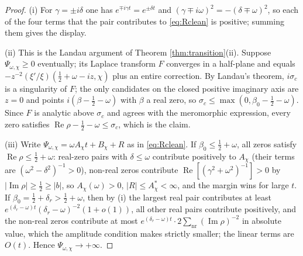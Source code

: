\documentclass[11pt,reqno]{amsart}
\theoremstyle{plain}
\theoremstyle{definition}
\newcommand{\Rp}{\operatorname{Re}}
\newcommand{\Ip}{\operatorname{Im}}
\begin{document}
\begin{proof}
(i) For $\gamma=\pm i\delta$ one has $e^{\mp i\gamma t}=e^{\pm\delta t}$ and
$(\gamma\mp i\omega)^{2}=-(\delta\mp\omega)^{2}$, so each of the four terms that the pair
contributes to \eqref{eq:Rclean} is positive; summing them gives the display.

(ii) This is the Landau argument of Theorem \ref{thm:transition}(ii). Suppose
$\Psi_{\omega,\chi}\ge0$ eventually; its Laplace transform $F$ converges in a half-plane and
equals $-z^{-2}(\xi'/\xi)(\tfrac12+\omega-iz,\chi)$ plus an entire correction. By Landau's
theorem, $i\sigma_c$ is a singularity of $F$; the only candidates on the closed positive imaginary
axis are $z=0$ and points $i(\beta-\tfrac12-\omega)$ with $\beta$ a real zero, so
$\sigma_c\le\max(0,\beta_0-\tfrac12-\omega)$. Since $F$ is analytic above $\sigma_c$ and agrees
with the meromorphic expression, every zero satisfies
$\Rp\rho-\tfrac12-\omega\le\sigma_c$, which is the claim.

(iii) Write $\Psi_{\omega,\chi}=\omega A_\chi t+B_\chi+R$ as in \eqref{eq:Rclean}. If
$\beta_0\le\tfrac12+\omega$, all zeros satisfy $\Rp\rho\le\tfrac12+\omega$: real-zero pairs with
$\delta\le\omega$ contribute positively to $A_\chi$ (their terms are $(\omega^{2}-\delta^{2})^{-1}>0$),
non-real zeros contribute $\Rp[(\gamma^{2}+\omega^{2})^{-1}]>0$ by $|\Ip\rho|\ge\tfrac12\ge|b|$, so
$A_\chi(\omega)>0$, $|R|\le A^{*}_\chi<\infty$, and the margin wins for large $t$. If
$\beta_0=\tfrac12+\delta_r>\tfrac12+\omega$, then by (i) the largest real pair contributes at least
$e^{(\delta_r-\omega)t}(\delta_r-\omega)^{-2}(1+o(1))$, all other real pairs contribute positively,
and the non-real zeros contribute at most
$e^{(\delta_r-\omega)t}\cdot2\sum_{\mathrm{nr}}(\Ip\rho)^{-2}$ in absolute value, which the
amplitude condition makes strictly smaller; the linear terms are $O(t)$. Hence
$\Psi_{\omega,\chi}\to+\infty$.
\end{proof}
\end{document}
